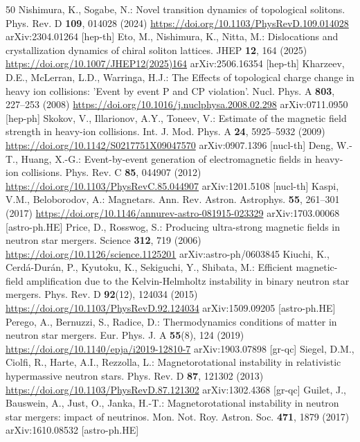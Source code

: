 \begin{thebibliography}{50}
 Nishimura, K., Sogabe, N.: Novel transition dynamics of topological solitons. Phys. Rev. D \textbf{109}, 014028 (2024) \url{https://doi.org/10.1103/PhysRevD.109.014028} arXiv:2304.01264 [hep-th]
 Eto, M., Nishimura, K., Nitta, M.: Dislocations and crystallization dynamics of chiral soliton lattices. JHEP \textbf{12}, 164 (2025) \url{https://doi.org/10.1007/JHEP12(2025)164} arXiv:2506.16354 [hep-th]
 Kharzeev, D.E., McLerran, L.D., Warringa, H.J.: The Effects of topological charge change in heavy ion collisions: 'Event by event P and CP violation'. Nucl. Phys. A \textbf{803}, 227--253 (2008) \url{https://doi.org/10.1016/j.nuclphysa.2008.02.298} arXiv:0711.0950 [hep-ph]
 Skokov, V., Illarionov, A.Y., Toneev, V.: Estimate of the magnetic field strength in heavy-ion collisions. Int. J. Mod. Phys. A \textbf{24}, 5925--5932 (2009) \url{https://doi.org/10.1142/S0217751X09047570} arXiv:0907.1396 [nucl-th]
 Deng, W.-T., Huang, X.-G.: Event-by-event generation of electromagnetic fields in heavy-ion collisions. Phys. Rev. C \textbf{85}, 044907 (2012) \url{https://doi.org/10.1103/PhysRevC.85.044907} arXiv:1201.5108 [nucl-th]
 Kaspi, V.M., Beloborodov, A.: Magnetars. Ann. Rev. Astron. Astrophys. \textbf{55}, 261--301 (2017) \url{https://doi.org/10.1146/annurev-astro-081915-023329} arXiv:1703.00068 [astro-ph.HE]
 Price, D., Rosswog, S.: Producing ultra-strong magnetic fields in neutron star mergers. Science \textbf{312}, 719 (2006) \url{https://doi.org/10.1126/science.1125201} arXiv:astro-ph/0603845
 Kiuchi, K., Cerd\'a-Dur\'an, P., Kyutoku, K., Sekiguchi, Y., Shibata, M.: Efficient magnetic-field amplification due to the Kelvin-Helmholtz instability in binary neutron star mergers. Phys. Rev. D \textbf{92}(12), 124034 (2015) \url{https://doi.org/10.1103/PhysRevD.92.124034} arXiv:1509.09205 [astro-ph.HE]
 Perego, A., Bernuzzi, S., Radice, D.: Thermodynamics conditions of matter in neutron star mergers. Eur. Phys. J. A \textbf{55}(8), 124 (2019) \url{https://doi.org/10.1140/epja/i2019-12810-7} arXiv:1903.07898 [gr-qc]
 Siegel, D.M., Ciolfi, R., Harte, A.I., Rezzolla, L.: Magnetorotational instability in relativistic hypermassive neutron stars. Phys. Rev. D \textbf{87}, 121302 (2013) \url{https://doi.org/10.1103/PhysRevD.87.121302} arXiv:1302.4368 [gr-qc]
 Guilet, J., Bauswein, A., Just, O., Janka, H.-T.: Magnetorotational instability in neutron star mergers: impact of neutrinos. Mon. Not. Roy. Astron. Soc. \textbf{471}, 1879 (2017) arXiv:1610.08532 [astro-ph.HE]

\end{thebibliography}

